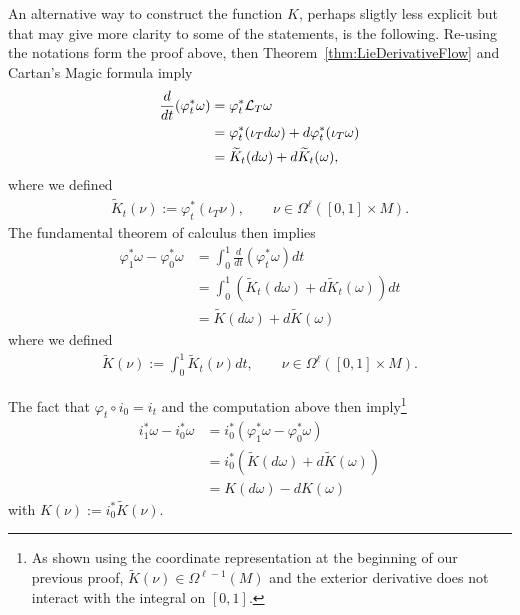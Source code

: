 \begin{remark}
  An alternative way to construct the function $K$, perhaps sligtly less explicit but that may give more clarity to some of the statements, is the following. Re-using the notations form the proof above, then Theorem~\ref{thm:LieDerivativeFlow} and Cartan's Magic formula imply
  \begin{align}
    \frac{d}{dt} (\varphi_t^*\omega) & = \varphi^*_t \mathcal{L}_T \omega                                        \\
                                     & = \varphi_t^* ( \iota_T d\omega) + d \varphi_t^* (\iota_T \omega) \\
                                     & = \widetilde K_t (d\omega) + d \widetilde K_t (\omega),
  \end{align}
  where we defined
  \begin{align}
    \widetilde K_t(\nu) := \varphi_t^* (\iota_T \nu),
    \qquad \nu \in \Omega^\ell([0,1]\times M).
  \end{align}
  The fundamental theorem of calculus then implies
  \begin{align}
    \varphi_1^* \omega - \varphi_0^* \omega & = \int_0^1 \frac{d}{dt} (\varphi_t^*\omega) dt                                 \\
                                            & = \int_0^1 \left(\widetilde K_t (d\omega) + d \widetilde K_t(\omega)\right) dt \\
                                            & = \widetilde K (d\omega) + d \widetilde K (\omega)
  \end{align}
  where we defined
  \begin{align}
    \widetilde K(\nu) := \int_0^1 \widetilde K_t (\nu) dt,
    \qquad \nu \in \Omega^\ell([0,1]\times M).
  \end{align}

  The fact that $\varphi_t \circ i_0 = i_t$ and the computation above then imply\footnote{As shown using the coordinate representation at the beginning of our previous proof, $\widetilde K(\nu) \in \Omega^{\ell-1}(M)$ and the exterior derivative does not interact with the integral on $[0,1]$.}
  \begin{align}
    i_1^* \omega - i_0^* \omega & = i_0^* (\varphi_1^* \omega - \varphi_0^* \omega)                     \\
                                & = i_0^* \left(\widetilde K (d\omega) + d \widetilde K (\omega)\right) \\
                                & = K(d \omega) - d K(\omega)
  \end{align}
  with $K(\nu) := i_0^* \widetilde K(\nu)$.
\end{remark}

